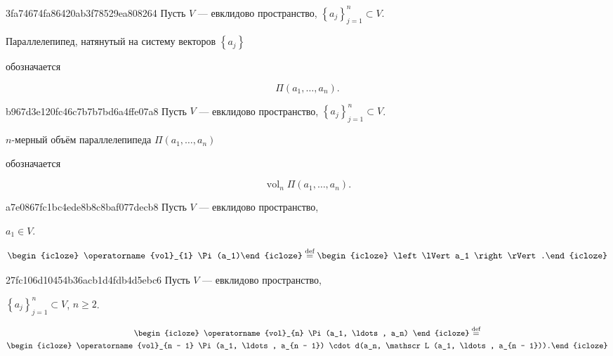 \begin{note}{3fa74674fa86420ab3f78529ea808264}
    Пусть \({ V }\) --- евклидово пространство, \({ \left\{ a_j \right\}_{j = 1}^{n} \subset V }\).
    \begin{icloze}{2}Параллелепипед, натянутый на систему векторов \({ \left\{ a_j \right\} }\)\end{icloze} обозначается
    \begin{icloze}{1}
        \[
            \Pi (a_1, \ldots, a_n).
        \]
    \end{icloze}
\end{note}

\begin{note}{b967d3e120fc46c7b7b7bd6a4ffe07a8}
    Пусть \({ V }\) --- евклидово пространство, \({ \left\{ a_j \right\}_{j = 1}^{n} \subset V }\).
    \begin{icloze}{2}\({ n }\)-мерный объём параллелепипеда \({ \Pi (a_1, \ldots, a_n) }\)\end{icloze} обозначается
    \begin{icloze}{1}
        \[
            \operatorname{vol}_{n} \Pi(a_1, \ldots, a_n).
        \]
    \end{icloze}
\end{note}

\begin{note}{a7e0867fc1bc4ede8b8c8baf077decb8}
    Пусть \({ V }\) --- евклидово пространство, \begin{icloze}{3}\({ a_1 \in V }\).\end{icloze}
    \[
        \begin{icloze}{2}\operatorname{vol}_{1} \Pi(a_1)\end{icloze} \overset{\text{def}}= \begin{icloze}{1}\left\lVert a_1 \right\rVert.\end{icloze}
    \]
\end{note}

\begin{note}{27fc106d10454b36acb1d4fdb4d5ebc6}
    Пусть \({ V }\) --- евклидово пространство, \begin{icloze}{3}\({ \left\{ a_j \right\}_{j = 1}^{n} \subset V }\), \({ n \geqslant 2 }\).\end{icloze}
    \begin{multline*}
        \begin{icloze}{2}\operatorname{vol}_{n} \Pi(a_1, \ldots, a_n) \end{icloze}
        \overset{\text{def}}= \\
        \begin{icloze}{1}\operatorname{vol}_{n - 1} \Pi(a_1, \ldots, a_{n - 1}) \cdot d(a_n, \mathscr L (a_1, \ldots, a_{n - 1})).\end{icloze}
    \end{multline*}
\end{note}


